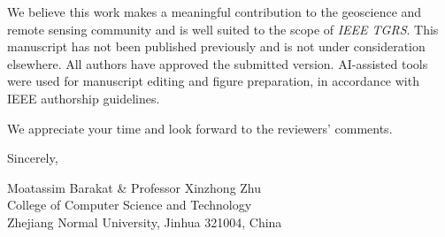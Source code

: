 \documentclass[11pt, a4paper]{article}
\begin{document}
We believe this work makes a meaningful contribution to the geoscience and
remote sensing community and is well suited to the scope of \textit{IEEE
TGRS}. This manuscript has not been published previously and is not under
consideration elsewhere. All authors have approved the submitted version.
AI-assisted tools were used for manuscript editing and figure preparation, in
accordance with IEEE authorship guidelines.

We appreciate your time and look forward to the reviewers' comments.

\bigskip

Sincerely,

\bigskip\bigskip

Moatassim Barakat \& Professor Xinzhong Zhu \\
College of Computer Science and Technology \\
Zhejiang Normal University, Jinhua 321004, China
\end{document}
